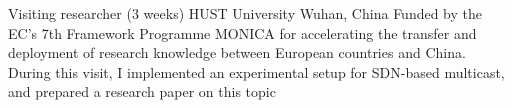 \documentclass[11pt,a4paper]{moderncv}
\begin{document}
					{Visiting researcher (3 weeks)}
					{HUST University}
					{Wuhan, China}{}
					{Funded by the EC’s 7th Framework Programme MONICA for accelerating the transfer
					 and deployment of research knowledge between European countries and China.
					 During this visit, I implemented an experimental setup for SDN-based multicast,
					 and prepared a research paper on this topic~\cite{humernbrum}
					}

\printbibheading[title={Publications}]
\printbibliography[heading=none]
%
%

\end{document}
